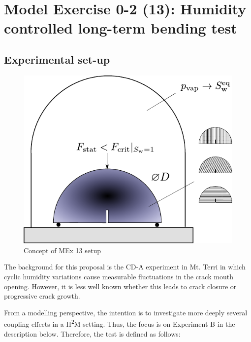 \section{Model Exercise 0-2 (13): Humidity controlled long-term bending test}
\label{sec:mex13}
\subsection{Experimental set-up}

\begin{figure}[!ht]
\centering
\includegraphics[width=\textwidth]{figures/GeomInt_MEx13.pdf}
\caption{Concept of MEx 13 setup}
\label{fig:GeomInt_MEx13}
\end{figure}

The background for this proposal is the CD-A experiment in Mt. Terri in which cyclic humidity variations cause measurable fluctuations in the crack mouth opening. However, it is less well known whether this leads to crack closure or progressive crack growth. 

From a modelling perspective, the intention is to investigate more deeply several coupling effects in a H\textsuperscript{2}M setting. Thus, the focus is on Experiment B in the description below. Therefore, the test is defined as follows:

